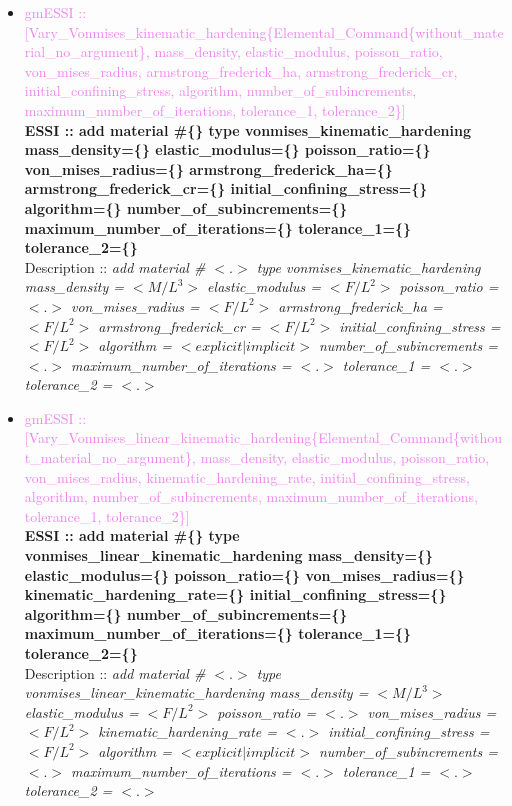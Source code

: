 \documentclass[11pt]{article}
\begin{document}
\begin{itemize}
    \item \textcolor{violet}{gmESSI :: [Vary\_Vonmises\_kinematic\_hardening\{Elemental\_Command\{without\_material\_no\_argument\}, mass\_density, elastic\_modulus, poisson\_ratio, von\_mises\_radius, armstrong\_frederick\_ha, armstrong\_frederick\_cr, initial\_confining\_stress, algorithm, number\_of\_subincrements, maximum\_number\_of\_iterations, tolerance\_1, tolerance\_2\}]}\\
    \textbf{ESSI :: add material \#\{\} type vonmises\_kinematic\_hardening mass\_density=\{\} elastic\_modulus=\{\} poisson\_ratio=\{\} von\_mises\_radius=\{\} armstrong\_frederick\_ha=\{\} armstrong\_frederick\_cr=\{\} initial\_confining\_stress=\{\} algorithm=\{\} number\_of\_subincrements=\{\} maximum\_number\_of\_iterations=\{\} tolerance\_1=\{\} tolerance\_2=\{\}}\\
    Description ::  \textit{ add material \# $<.>$ type vonmises\_kinematic\_hardening mass\_density = $<M/L^3>$ elastic\_modulus = $<F/L^2>$ poisson\_ratio = $<.>$ von\_mises\_radius = $<F/L^2>$ armstrong\_frederick\_ha = $<F/L^2>$ armstrong\_frederick\_cr = $<F/L^2>$ initial\_confining\_stress = $<F/L^2>$ algorithm = $<explicit|implicit>$ number\_of\_subincrements = $<.>$ maximum\_number\_of\_iterations = $<.>$ tolerance\_1 = $<.>$ tolerance\_2 = $<.>$} 

    \item \textcolor{violet}{gmESSI :: [Vary\_Vonmises\_linear\_kinematic\_hardening\{Elemental\_Command\{without\_material\_no\_argument\}, mass\_density, elastic\_modulus, poisson\_ratio, von\_mises\_radius, kinematic\_hardening\_rate, initial\_confining\_stress, algorithm, number\_of\_subincrements, maximum\_number\_of\_iterations, tolerance\_1, tolerance\_2\}]}\\
    \textbf{ESSI :: add material \#\{\} type vonmises\_linear\_kinematic\_hardening mass\_density=\{\} elastic\_modulus=\{\} poisson\_ratio=\{\} von\_mises\_radius=\{\} kinematic\_hardening\_rate=\{\} initial\_confining\_stress=\{\} algorithm=\{\} number\_of\_subincrements=\{\} maximum\_number\_of\_iterations=\{\} tolerance\_1=\{\} tolerance\_2=\{\}}\\
    Description ::  \textit{ add material \# $<.>$ type vonmises\_linear\_kinematic\_hardening mass\_density = $<M/L^3>$ elastic\_modulus = $<F/L^2>$ poisson\_ratio = $<.>$ von\_mises\_radius = $<F/L^2>$ kinematic\_hardening\_rate = $<.>$ initial\_confining\_stress = $<F/L^2>$ algorithm = $<explicit|implicit>$ number\_of\_subincrements = $<.>$ maximum\_number\_of\_iterations = $<.>$ tolerance\_1 = $<.>$ tolerance\_2 = $<.>$} 


\end{itemize}
\end{document}
